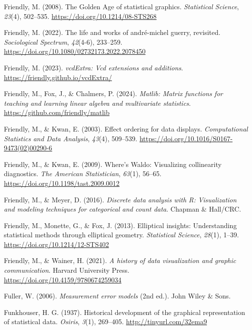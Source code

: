 \documentclass[
  letterpaper,
  10pt,
  krantz2]{krantz}
\newlength{\cslhangindent}
\newenvironment{CSLReferences}[2] %
 {\begin{list}{}{%
  \setlength{\itemindent}{0pt}
  \setlength{\leftmargin}{0pt}
  \setlength{\parsep}{0pt}
  \ifodd #1
   \setlength{\leftmargin}{\cslhangindent}
   \setlength{\itemindent}{-1\cslhangindent}
  \fi
  \setlength{\itemsep}{#2\baselineskip}}}
 {\end{list}}
\begin{document}
\begin{CSLReferences}{1}{0}
Friendly, M. (2008). The {Golden Age} of statistical graphics.
\emph{Statistical Science}, \emph{23}(4), 502--535.
\url{https://doi.org/10.1214/08-STS268}

Friendly, M. (2022). The life and works of andr{é}-michel guerry,
revisited. \emph{Sociological Spectrum}, \emph{42}(4-6), 233--259.
\url{https://doi.org/10.1080/02732173.2022.2078450}

Friendly, M. (2023). \emph{vcdExtra: Vcd extensions and additions}.
\url{https://friendly.github.io/vcdExtra/}

Friendly, M., Fox, J., \& Chalmers, P. (2024). \emph{Matlib: Matrix
functions for teaching and learning linear algebra and multivariate
statistics}. \url{https://github.com/friendly/matlib}

Friendly, M., \& Kwan, E. (2003). Effect ordering for data displays.
\emph{Computational Statistics and Data Analysis}, \emph{43}(4),
509--539. \url{https://doi.org/10.1016/S0167-9473(02)00290-6}

Friendly, M., \& Kwan, E. (2009). Where's {Waldo}: Visualizing
collinearity diagnostics. \emph{The American Statistician},
\emph{63}(1), 56--65. \url{https://doi.org/10.1198/tast.2009.0012}

Friendly, M., \& Meyer, D. (2016). \emph{Discrete data analysis with
{R}: Visualization and modeling techniques for categorical and count
data}. Chapman \& Hall/CRC.

Friendly, M., Monette, G., \& Fox, J. (2013). Elliptical insights:
Understanding statistical methods through elliptical geometry.
\emph{Statistical Science}, \emph{28}(1), 1--39.
\url{https://doi.org/10.1214/12-STS402}

Friendly, M., \& Wainer, H. (2021). \emph{A history of data
visualization and graphic communication}. Harvard University Press.
\url{https://doi.org/10.4159/9780674259034}

Fuller, W. (2006). \emph{Measurement error models} (2nd ed.). John Wiley
\& Sons.

Funkhouser, H. G. (1937). Historical development of the graphical
representation of statistical data. \emph{Osiris}, \emph{3}(1),
269--405. \url{http://tinyurl.com/32ema9}


\end{CSLReferences}
\end{document}
